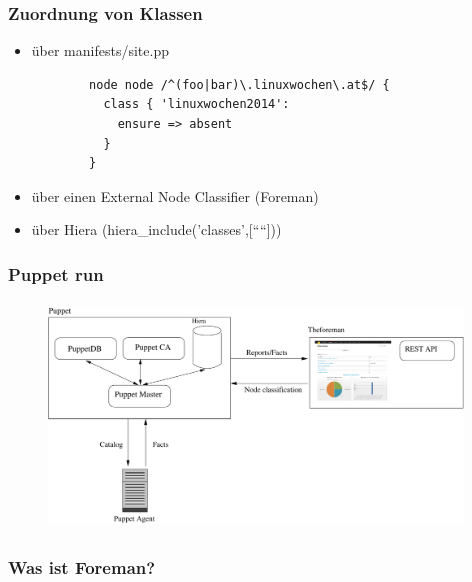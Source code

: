 \documentclass{beamer}
\begin{document}
\begin{frame}[fragile]
  \frametitle{Zuordnung von Klassen}

  \begin{itemize}
    \item über manifests/site.pp
      \begin{lstlisting}
        node node /^(foo|bar)\.linuxwochen\.at$/ {
          class { 'linuxwochen2014':
            ensure => absent
          }
        }
      \end{lstlisting}
  \item über einen External Node Classifier (Foreman)
  \item über Hiera (hiera\_include('classes',[````]))
  \end{itemize}
\end{frame}


\begin{frame}
  \frametitle{Puppet run}
  \begin{figure}[ht]
    \centering
      \includegraphics[height=6cm,width=11cm]{../pics/puppet_overview}
    \label{fig:stack}
  \end{figure}
\end{frame}

\begin{frame}
  \frametitle{Was ist Foreman?}
  \begin{figure}[ht]
    \centering
    \label{fig:stack}
  \end{figure}
\end{frame}
\end{document}
